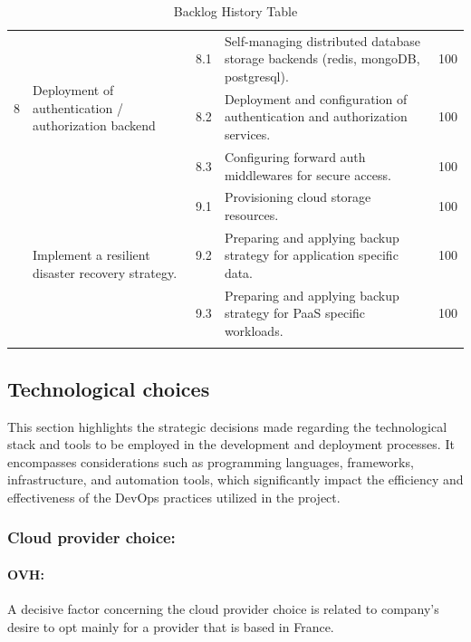 \begin{longtable}[H]{|m{1cm}|m{3.25cm}|m{1cm}|m{7cm}|m{1.2cm}|}
\multirow{3}{1cm}{8} & \multirow{3}{3.25cm}{\raggedright Deployment of authentication / authorization backend} 	& 8.1 & \raggedright Self-managing distributed database storage backends (redis, mongoDB, postgresql).	 & 100\\
\cline{3-5}
&   & 8.2 &	\raggedright Deployment and configuration of authentication and authorization services.	 & 100\\
\cline{3-5}
&   & 8.3 &	\raggedright Configuring forward auth middlewares for secure access.	 & 100\\
   \hline
   \pagebreak
   \hline
\multirow{3}{1cm}{9} & \multirow{3}{3.25cm}{\raggedright Implement a resilient disaster recovery strategy.} & 9.1 &\raggedright  Provisioning cloud storage resources.		 & 100\\
\cline{3-5}
&   & 9.2 & \raggedright Preparing and applying backup strategy for application specific data.	 & 100\\
\cline{3-5}
&   & 9.3 &	\raggedright Preparing and applying backup strategy for PaaS specific workloads.	 & 100\\
 \hline
\caption{ Backlog History Table }
\end{longtable}

\subsection{Technological choices }
\hspace{7mm}This section highlights the strategic decisions made regarding the technological stack and tools to be employed in the development and deployment processes. It encompasses considerations such as programming languages, frameworks, infrastructure, and automation tools, which significantly impact the efficiency and effectiveness of the DevOps practices utilized in the project.
\subsubsection{Cloud provider choice: } 

\paragraph{OVH\cite{OVHcloud}: }

A decisive factor concerning the cloud provider choice is related to company’s desire to opt mainly for a provider that is based in France.  

